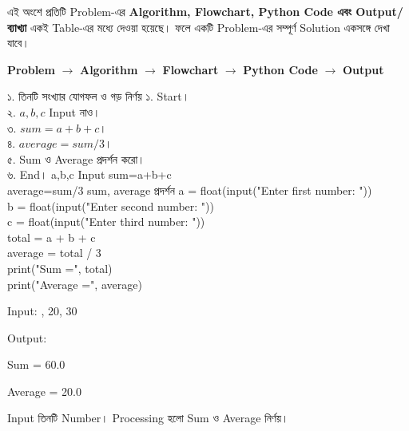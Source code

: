 
এই অংশে প্রতিটি Problem-এর
\textbf{Algorithm, Flowchart, Python Code এবং Output/ব্যাখ্যা}
একই Table-এর মধ্যে দেওয়া হয়েছে। ফলে একটি Problem-এর সম্পূর্ণ
Solution একসঙ্গে দেখা যাবে।

\begin{rememberbox}

\begin{center}

\textbf{Problem}
\(\longrightarrow\)
\textbf{Algorithm}
\(\longrightarrow\)
\textbf{Flowchart}
\(\longrightarrow\)
\textbf{Python Code}
\(\longrightarrow\)
\textbf{Output}

\end{center}

\end{rememberbox}




\exerciseTable
{১. তিনটি সংখ্যার যোগফল ও গড় নির্ণয়}
{
১. Start।\\
২. \(a,b,c\) Input নাও।\\
৩. \(sum=a+b+c\)।\\
৪. \(average=sum/3\)।\\
৫. Sum ও Average প্রদর্শন করো।\\
৬. End।
}
{
\linearflow
{a,b,c Input}
{sum=a+b+c\\average=sum/3}
{sum, average প্রদর্শন}
}
{
a = float(input("Enter first number: "))\\
b = float(input("Enter second number: "))\\
c = float(input("Enter third number: "))\\[0.5mm]
total = a + b + c\\
average = total / 3\\
print("Sum =", total)\\
print("Average =", average)
}
{
Input:
\textenglish{, 20, 30}

\medskip

Output:

\textenglish{\ttfamily Sum = 60.0}

\textenglish{\ttfamily Average = 20.0}

\medskip

Input তিনটি Number।
Processing হলো Sum ও Average নির্ণয়।
}

